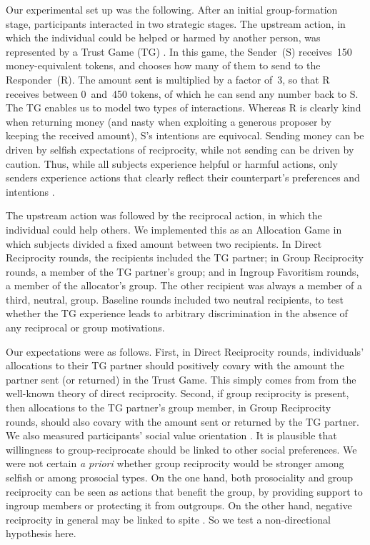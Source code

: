 \documentclass[12pt,a4paper]{article}\usepackage[]{graphicx}\usepackage[]{color}
\begin{document}
Our experimental set up was the following. After an initial group-formation stage, participants interacted in two strategic stages. The upstream action, in which the individual could be helped  or harmed by another person, was represented by a Trust Game (TG) \citep{berg1995trust}.  In this game, the Sender~(S) receives~150 money-equivalent tokens, and chooses how many of them to send to the Responder~(R). The amount sent is multiplied by a factor of~3, so that R receives between 0~and~450 tokens, of which he can send any number back to S. The TG enables us to model two types of interactions. Whereas R is clearly kind when returning money (and nasty when exploiting a generous proposer by keeping the received amount), S's intentions are equivocal. Sending money can be driven by selfish expectations of reciprocity, while not sending can be driven by caution. Thus, while all subjects experience helpful or harmful actions, only senders experience actions that clearly reflect their counterpart's preferences and intentions \citep{gunnthorsdottir2002using,kimbrough2015norms}.

The upstream action was followed by the reciprocal action, 
in which the individual could help others. We implemented this as an Allocation
Game in which subjects divided a fixed amount between two recipients.
In Direct Reciprocity rounds, the recipients included the TG partner;
in Group Reciprocity rounds, a member of the TG partner's group; and
in Ingroup Favoritism rounds, a member of the allocator's group.
The other recipient was always a member of a third, neutral, group.
Baseline rounds included two neutral recipients, to test whether the
TG experience leads to arbitrary discrimination in the absence of any reciprocal
or group motivations.

Our expectations were as follows. First, in Direct Reciprocity rounds, individuals' allocations to their TG partner
should positively covary with the amount the partner sent (or returned) in the Trust Game. This simply comes from
from the well-known theory of direct reciprocity. Second, if group reciprocity is present, then allocations to the TG partner's group member, in Group Reciprocity rounds, should also covary with the amount sent or returned by the TG partner.
We also measured participants' social value orientation \citep{van1999pursuit}. It is plausible that willingness to group-reciprocate should
be linked to other social preferences. We were not certain \emph{a priori} whether group reciprocity would be stronger
among selfish or among prosocial types. On the one hand, both prosociality and group reciprocity can be seen as actions
that benefit the group, by providing support to ingroup members or protecting it from outgroups. On the other hand,
negative reciprocity in general may be linked to spite \citep{johnstone2004evolution}. So we test a non-directional hypothesis here.
\end{document}
